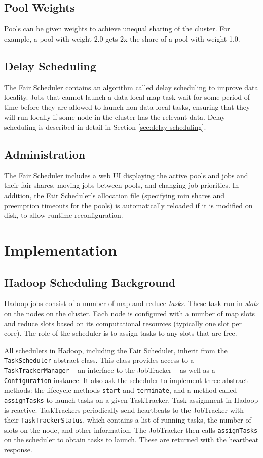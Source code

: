 \documentclass[11pt]{article}
\begin{document}
\subsection{Pool Weights}

Pools can be given weights to achieve unequal sharing of the cluster. For example, a pool with weight 2.0 gets 2x the share of a pool with weight 1.0.

\subsection{Delay Scheduling}

The Fair Scheduler contains an algorithm called delay scheduling to improve data locality. Jobs that cannot launch a data-local map task wait for some period of time before they are allowed to launch non-data-local tasks, ensuring that they will run locally if some node in the cluster has the relevant data. Delay scheduling is described in detail in Section \ref{sec:delay-scheduling}.

\subsection{Administration}

The Fair Scheduler includes a web UI displaying the active pools and jobs and their fair shares, moving jobs between pools, and changing job priorities.
In addition, the Fair Scheduler's allocation file (specifying min shares and preemption timeouts for the pools) is automatically reloaded if it is modified on disk, to allow runtime reconfiguration.

\section{Implementation}

\subsection{Hadoop Scheduling Background}

Hadoop jobs consist of a number of map and reduce \emph{tasks}. These task run in \emph{slots} on the nodes on the cluster. Each node is configured with a number of map slots and reduce slots based on its computational resources (typically one slot per core). The role of the scheduler is to assign tasks to any slots that are free.

All schedulers in Hadoop, including the Fair Scheduler, inherit from the {\tt TaskScheduler} abstract class. This class provides access to a {\tt TaskTrackerManager} -- an interface to the JobTracker -- as well as a {\tt Configuration} instance. It also ask the scheduler to implement three abstract methods: the lifecycle methods {\tt start} and {\tt terminate}, and a method called {\tt assignTasks} to launch tasks on a given TaskTracker.
Task assignment in Hadoop is reactive. TaskTrackers periodically send heartbeats to the JobTracker with their {\tt TaskTrackerStatus}, which contains a list of running tasks, the number of slots on the node, and other information. The JobTracker then calls {\tt assignTasks} on the scheduler to obtain tasks to launch. These are returned with the heartbeat response.
\end{document}
